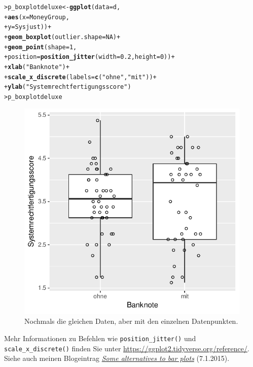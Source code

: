\documentclass[oneside, 10pt]{book}\usepackage[]{graphicx}\usepackage[]{xcolor}
\makeatletter
\newcommand{\hlnum}[1]{\textcolor[rgb]{0.686,0.059,0.569}{#1}}%
\newcommand{\hlstr}[1]{\textcolor[rgb]{0.192,0.494,0.8}{#1}}%
\newcommand{\hlopt}[1]{\textcolor[rgb]{0,0,0}{#1}}%
\newcommand{\hlstd}[1]{\textcolor[rgb]{0.345,0.345,0.345}{#1}}%
\newcommand{\hlkwb}[1]{\textcolor[rgb]{0.69,0.353,0.396}{#1}}%
\newcommand{\hlkwc}[1]{\textcolor[rgb]{0.333,0.667,0.333}{#1}}%
\newcommand{\hlkwd}[1]{\textcolor[rgb]{0.737,0.353,0.396}{\textbf{#1}}}%
\newenvironment{kframe}{%
 \def\at@end@of@kframe{}%
 \ifinner\ifhmode%
  \def\at@end@of@kframe{\end{minipage}}%
  \begin{minipage}{\columnwidth}%
 \fi\fi%
 \def\FrameCommand##1{\hskip\@totalleftmargin \hskip-\fboxsep
 \colorbox{shadecolor}{##1}\hskip-\fboxsep
     \hskip-\linewidth \hskip-\@totalleftmargin \hskip\columnwidth}%
 \MakeFramed {\advance\hsize-\width
   \@totalleftmargin\z@ \linewidth\hsize
   \@setminipage}}%
 {\par\unskip\endMakeFramed%
 \at@end@of@kframe}
\newenvironment{knitrout}{}{} %
\makeatother
\begin{document}
\begin{knitrout}
\color{fgcolor}\begin{kframe}
\begin{alltt}
\hlstd{> }\hlstd{p_boxplotdeluxe} \hlkwb{<-} \hlkwd{ggplot}\hlstd{(}\hlkwc{data} \hlstd{= d,}
\hlstd{+ }                    \hlkwd{aes}\hlstd{(}\hlkwc{x} \hlstd{= MoneyGroup,}
\hlstd{+ }                        \hlkwc{y} \hlstd{= Sysjust))} \hlopt{+}
\hlstd{+ }  \hlkwd{geom_boxplot}\hlstd{(}\hlkwc{outlier.shape} \hlstd{=} \hlnum{NA}\hlstd{)} \hlopt{+}
\hlstd{+ }  \hlkwd{geom_point}\hlstd{(}\hlkwc{shape} \hlstd{=} \hlnum{1}\hlstd{,}
\hlstd{+ }             \hlkwc{position} \hlstd{=} \hlkwd{position_jitter}\hlstd{(}\hlkwc{width} \hlstd{=} \hlnum{0.2}\hlstd{,} \hlkwc{height} \hlstd{=} \hlnum{0}\hlstd{))} \hlopt{+}
\hlstd{+ }  \hlkwd{xlab}\hlstd{(}\hlstr{"Banknote"}\hlstd{)} \hlopt{+}
\hlstd{+ }  \hlkwd{scale_x_discrete}\hlstd{(}\hlkwc{labels} \hlstd{=} \hlkwd{c}\hlstd{(}\hlstr{"ohne"}\hlstd{,} \hlstr{"mit"}\hlstd{))} \hlopt{+}
\hlstd{+ }  \hlkwd{ylab}\hlstd{(}\hlstr{"Systemrechtfertigungsscore"}\hlstd{)}
\hlstd{> }\hlstd{p_boxplotdeluxe}
\end{alltt}
\end{kframe}\begin{figure}[tp]

{\centering \includegraphics[width=.5\textwidth]{figs/unnamed-chunk-244-1} 

}

\caption{Nochmals die gleichen Daten, aber mit den einzelnen Datenpunkten.\label{fig:boxplotklein2}}\label{fig:unnamed-chunk-244}
\end{figure}

\end{knitrout}

Mehr Informationen zu Befehlen wie \texttt{position\_jitter()} und \texttt{scale\_x\_discrete()} finden Sie unter \url{https://ggplot2.tidyverse.org/reference/}.
Siehe auch meinen Blogeintrag \href{https://janhove.github.io/reporting/2015/01/07/some-alternatives-to-barplots}{\textit{Some alternatives to bar plots}} (7.1.2015).
\end{document}
